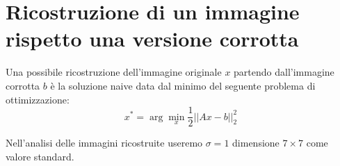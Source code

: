 \section{Ricostruzione di un immagine rispetto una versione corrotta}
Una possibile ricostruzione dell'immagine originale $x$ partendo dall'immagine corrotta $b$ è la soluzione naive data dal minimo del seguente problema di ottimizzazione:
\[x^* = \arg\min_x \frac{1}{2} ||Ax - b||_2^2\]

Nell'analisi delle immagini ricostruite useremo $\sigma=1$ dimensione $7\times 7$ come valore standard.

